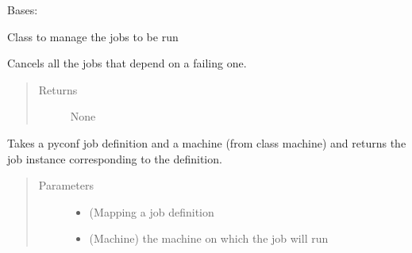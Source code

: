 \documentclass[a4paper,10pt,english]{sphinxmanual}
\begin{document}
\begin{fulllineitems}
\label{\detokenize{apidoc_commands/commands:commands.jobs.Jobs}}
Bases: 

Class to manage the jobs to be run

\begin{fulllineitems}
\label{\detokenize{apidoc_commands/commands:commands.jobs.Jobs.cancel_dependencies_of_failing_jobs}}
Cancels all the jobs that depend on a failing one.
\begin{quote}\begin{description}
\item[{Returns}] \leavevmode
None

\end{description}\end{quote}

\end{fulllineitems}


\begin{fulllineitems}
\label{\detokenize{apidoc_commands/commands:commands.jobs.Jobs.define_job}}
Takes a pyconf job definition and a machine (from class machine)
and returns the job instance corresponding to the definition.
\begin{quote}\begin{description}
\item[{Parameters}] \leavevmode\begin{itemize}
\item {} 
 \textendash{} (Mapping a job definition

\item {} 
 \textendash{} (Machine) the machine on which the job will run

\end{itemize}


\end{description}
\end{quote}
\end{fulllineitems}
\end{fulllineitems}
\end{document}
